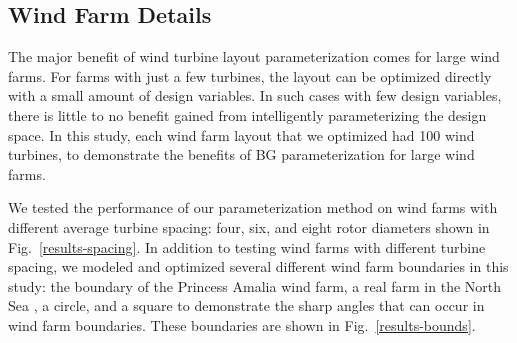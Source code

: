 \documentclass[wes, manuscript]{copernicus}
\begin{document}
\subsection{Wind Farm Details}
The major benefit of wind turbine layout parameterization comes for large wind farms. For farms with just a few turbines, the layout can be optimized directly with a small amount of design variables. In such cases with few design variables, there is little to no benefit gained from intelligently parameterizing the design space. In this study, each wind farm layout that we optimized had 100 wind turbines, to demonstrate the benefits of BG parameterization for large wind farms. 

We tested the performance of our parameterization method on wind farms with different average turbine spacing: four, six, and eight rotor diameters shown in Fig.~\ref{results-spacing}.
In addition to testing wind farms with different turbine spacing, we modeled and optimized several different wind farm boundaries in this study: the boundary of the Princess Amalia wind farm, a real farm in the North Sea \citep{van2012maximum,gebraad2015maximum,kanev2018active}, a circle, and a square to demonstrate the sharp angles that can occur in wind farm boundaries. These boundaries are shown in %
Fig.~\ref{results-bounds}.
%
%
%
%
\end{document}
